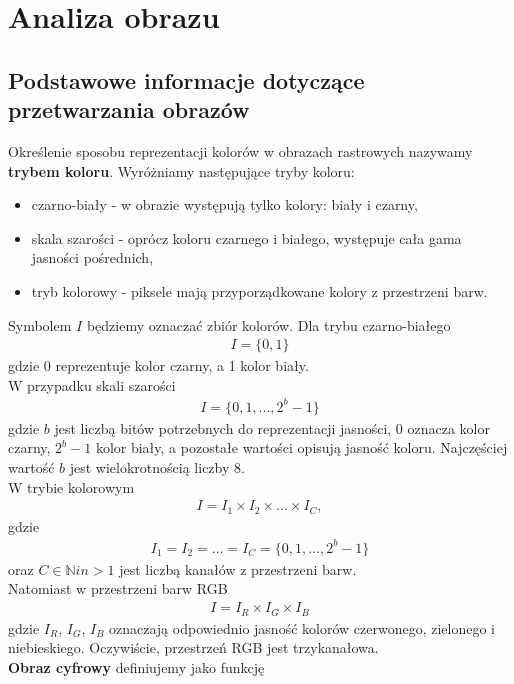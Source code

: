 \section{Analiza obrazu}
\subsection{Podstawowe informacje dotyczące przetwarzania obrazów}
Określenie sposobu reprezentacji kolorów w obrazach rastrowych nazywamy \textbf{trybem koloru}. Wyróżniamy następujące tryby koloru:
\begin{itemize}
  \item czarno-biały - w obrazie występują tylko kolory: biały i czarny,
  \item skala szarości - oprócz koloru czarnego i białego, występuje cała gama jasności pośrednich,
  \item tryb kolorowy - piksele mają przyporządkowane kolory z przestrzeni barw.
\end{itemize}
Symbolem $I$ będziemy oznaczać zbiór kolorów. Dla trybu czarno-białego
\begin{gather*}
  I = \{0, 1\}
\end{gather*} gdzie 0 reprezentuje kolor czarny, a 1 kolor biały.\\
W przypadku skali szarości
\begin{gather*}
  I = \{0, 1, ..., 2^b-1\}
\end{gather*}
gdzie $b$ jest liczbą bitów potrzebnych do reprezentacji jasności, 0 oznacza kolor czarny, $2^b-1$ kolor biały, a pozostałe wartości opisują jasność koloru. Najczęściej wartość $b$ jest wielokrotnością liczby 8.\\
W trybie kolorowym
\begin{gather*}
  I = I_1 \times I_2 \times ... \times I_C,
\end{gather*}
gdzie
\begin{gather*}
  I_1 = I_2 = ... = I_C = \{0, 1, ..., 2^b-1\}
\end{gather*}
oraz $C \in \mathbb{N} i n > 1$ jest liczbą kanałów z przestrzeni barw. \\
Natomiast w przestrzeni barw RGB
\begin{gather*}
  I = I_R \times I_G \times I_B
\end{gather*}
gdzie $I_R$, $I_G$, $I_B$ oznaczają odpowiednio jasność kolorów czerwonego, zielonego i niebieskiego. Oczywiście, przestrzeń RGB jest trzykanałowa.
\\
\textbf{Obraz cyfrowy} definiujemy jako funkcję
